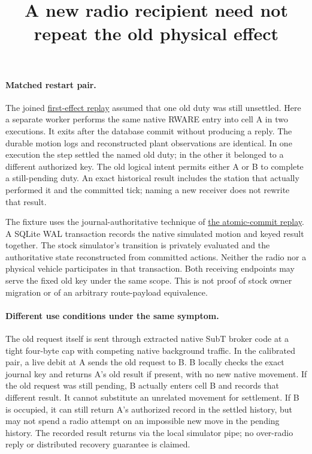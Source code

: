 \documentclass{article}
\title{A new radio recipient need not repeat the old physical effect}
\author{}
\date{}
\begin{document}
\maketitle
\paragraph{Matched restart pair.}
The joined \href{https://github.com/eternal-november/eos-research-programmes/pull/812}{first-effect replay}
assumed that one old duty was still unsettled. Here a separate worker
performs the same native RWARE entry into cell A in two executions.
It exits after the database commit without producing a reply.
The durable motion logs and reconstructed plant observations are
identical. In one execution the step settled the named old duty;
in the other it belonged to a different authorized key. The old
logical intent permits either A or B to complete a still-pending
duty. An exact historical result includes the station that actually
performed it and the committed tick; naming a new receiver does
not rewrite that result.

The fixture uses the journal-authoritative technique of
\href{https://github.com/eternal-november/eos-research-programmes/pull/633}{the atomic-commit replay}.
A SQLite WAL transaction records the native simulated motion
and keyed result together. The stock simulator's transition is
privately evaluated and the authoritative state reconstructed
from committed actions. Neither the radio nor a physical vehicle
participates in that transaction. Both receiving endpoints may serve
the fixed old key under the same scope. This is not proof of stock
owner migration or of an arbitrary route-payload equivalence.

\paragraph{Different use conditions under the same symptom.}
The old request itself is sent through extracted native SubT broker
code at a tight four-byte cap with competing native background
traffic. In the calibrated pair, a live debit at A sends the old
request to B. B locally checks the exact journal key and returns
A's old result if present, with no new native movement. If the
old request was still pending, B actually enters cell B and
records that different result. It cannot substitute an unrelated
movement for settlement. If B is occupied, it can still return A's
authorized record in the settled history, but may not spend a
radio attempt on an impossible new move in the pending history.
The recorded result returns via the local simulator pipe;
no over-radio reply or distributed recovery guarantee is claimed.
\end{document}
